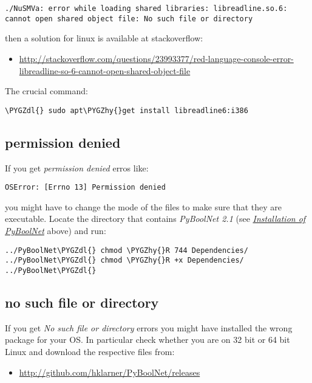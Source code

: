\documentclass[letterpaper,10pt,english]{sphinxmanual}
\def\PYGZdl{\char`\$}
\def\PYGZhy{\char`\-}
\begin{document}
\begin{Verbatim}[commandchars=\\\{\}]
./NuSMVa: error while loading shared libraries: libreadline.so.6:
cannot open shared object file: No such file or directory
\end{Verbatim}

then a solution for linux is available at stackoverflow:
\begin{itemize}
\item {} 
\href{http://stackoverflow.com/questions/23993377/red-language-console-error-libreadline-so-6-cannot-open-shared-object-file}{http://stackoverflow.com/questions/23993377/red-language-console-error-libreadline-so-6-cannot-open-shared-object-file}

\end{itemize}

The crucial command:

\begin{Verbatim}[commandchars=\\\{\}]
\PYGZdl{} sudo apt\PYGZhy{}get install libreadline6:i386
\end{Verbatim}


\subsection{permission denied}
\label{Installation:permission-denied}
If you get \emph{permission denied} erros like:

\begin{Verbatim}[commandchars=\\\{\}]
OSError: [Errno 13] Permission denied
\end{Verbatim}

you might have to change the mode of the files to make sure that they are executable.
Locate the directory that contains \emph{PyBoolNet 2.1} (see {\hyperref[Installation:installation-software]{\emph{Installation of PyBoolNet}}} above) and run:

\begin{Verbatim}[commandchars=\\\{\}]
../PyBoolNet\PYGZdl{} chmod \PYGZhy{}R 744 Dependencies/
../PyBoolNet\PYGZdl{} chmod \PYGZhy{}R +x Dependencies/
../PyBoolNet\PYGZdl{}
\end{Verbatim}


\subsection{no such file or directory}
\label{Installation:no-such-file-or-directory}
If you get \emph{No such file or directory} errors you might have installed the wrong package for your OS. In particular check whether you are on 32 bit or 64 bit Linux and download the respective files from:
\begin{itemize}
\item {} 
\href{http://github.com/hklarner/PyBoolNet/releases}{http://github.com/hklarner/PyBoolNet/releases}

\end{itemize}
\end{document}
